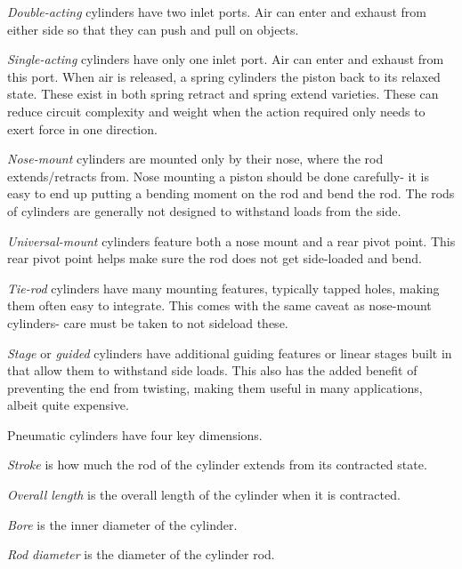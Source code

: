 \documentclass[10pt,letterpaper]{book}
\begin{document}
\begin{asparaenum}[a)]
	\item  \textit{Double-acting} cylinders have two inlet ports. Air can enter and exhaust from either side so that they can push and pull on objects.
	\item \textit{Single-acting} cylinders have only one inlet port. Air can enter and exhaust from this port. When air is released, a spring cylinders the piston back to its relaxed state. These exist in both spring retract and spring extend varieties. These can reduce circuit complexity and weight when the action required only needs to exert force in one direction.
	\item \textit{Nose-mount} cylinders are mounted only by their nose, where the rod extends/retracts from. Nose mounting a piston should be done carefully- it is easy to end up putting a bending moment on the rod and bend the rod. The rods of cylinders are generally not designed to withstand loads from the side.
	\item \textit{Universal-mount} cylinders feature both a nose mount and a rear pivot point. This rear pivot point helps make sure the rod does not get side-loaded and bend.
	\item \textit{Tie-rod} cylinders have many mounting features, typically tapped holes, making them often easy to integrate. This comes with the same caveat as nose-mount cylinders- care must be taken to not sideload these.
	\item \textit{Stage} or \textit{guided} cylinders have additional guiding features or linear stages built in that allow them to withstand side loads. This also has the added benefit of preventing the end from twisting, making them useful in many applications, albeit quite expensive.
\end{asparaenum}

Pneumatic cylinders have four key dimensions.
\begin{asparaenum}[a)]
	\item \textit{Stroke} is how much the rod of the cylinder extends from its contracted state.
	\item \textit{Overall length} is the overall length of the cylinder when it is contracted.
	\item \textit{Bore} is the inner diameter of the cylinder.
	\item \textit{Rod diameter} is the diameter of the cylinder rod.
\end{asparaenum}
\end{document}
